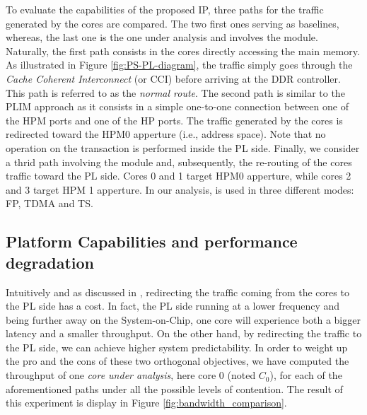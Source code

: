     To evaluate the capabilities of the proposed IP, three paths for the traffic generated by the cores are compared. The two first ones serving as baselines, whereas, the last one is the one under analysis and involves the \schim module.
    Naturally, the first path consists in the cores directly accessing the main memory. As illustrated in Figure \ref{fig:PS-PL-diagram}, the traffic simply goes through the \emph{Cache Coherent Interconnect} (or CCI) before arriving at the DDR controller. This path is referred to as the \emph{normal route}. The second path is similar to the PLIM approach as it consists in a simple one-to-one connection between one of the HPM ports and one of the HP ports. The traffic generated by the cores is redirected toward the HPM0 apperture (i.e., address space). Note that no operation  on the transaction is performed inside the PL side. Finally, we consider a thrid path involving the \schim module and, subsequently, the re-routing of the cores traffic toward the PL side. Cores 0 and 1 target HPM0 apperture, while cores 2 and 3 target HPM 1 apperture. In our analysis, \schim is used in three different modes: FP, TDMA and TS.

  \subsection{Platform Capabilities and performance degradation}
    \label{subsec:platform-capabilities-and-performance-degradation}
    Intuitively and as discussed in \cite{PLIM20}, redirecting the traffic coming from the cores to the PL side has a cost. In fact, the PL side running at a lower frequency and being further away on the System-on-Chip, one core will experience both a bigger latency and a smaller throughput. On the other hand, by redirecting the traffic to the PL side, we can achieve higher system predictability.    
    In order to weight up the pro and the cons of these two orthogonal objectives, we have computed the throughput of one \emph{core under analysis}, here core 0 (noted $C_{0}$), for each of the aforementioned paths under all the possible levels of contention. The result of this experiment is display in Figure \ref{fig:bandwidth_comparison}.
    
